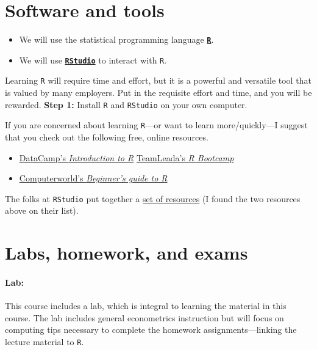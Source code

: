 \documentclass[10pt]{article}
\begin{document}
\section*{Software and tools}

\begin{itemize}
  \item We will use the statistical programming language \href{https://www.r-project.org/}{\textbf{\texttt{R}}}.
  \item We will use \href{https://www.rstudio.com}{\textbf{\texttt{RStudio}}} to interact with \texttt{R}.
\end{itemize}
Learning \texttt{R} will require time and effort, but it is a powerful and versatile tool that is valued by many employers. Put in the requisite effort and time, and you will be rewarded. \textbf{Step 1:} Install \texttt{R} and \texttt{RStudio} on your own computer.

If you are concerned about learning \texttt{R}---or want to learn more/quickly---I suggest that you check out the following free, online resources.
\begin{itemize}
  \item \href{https://www.datacamp.com/courses/free-introduction-to-r}{DataCamp's \textit{Introduction to R}}
  \href{https://www.teamleada.com/courses/r-bootcamp}{TeamLeada's \textit{R Bootcamp}}
  \item \href{https://www.computerworld.com/article/2497143/business-intelligence-beginner-s-guide-to-r-introduction.html}{Computerworld's \textit{Beginner's guide to R}}
\end{itemize}
The folks at \texttt{RStudio} put together a  \href{https://www.rstudio.com/online-learning/}{set of resources} (I found the two resources above on their list).

\section*{Labs, homework, and exams}

\paragraph{Lab:} This course includes a lab, which is integral to learning the material in this course. The lab includes general econometrics instruction but will focus on computing tips necessary to complete the homework assignments---linking the lecture material to \texttt{R}.
\end{document}
